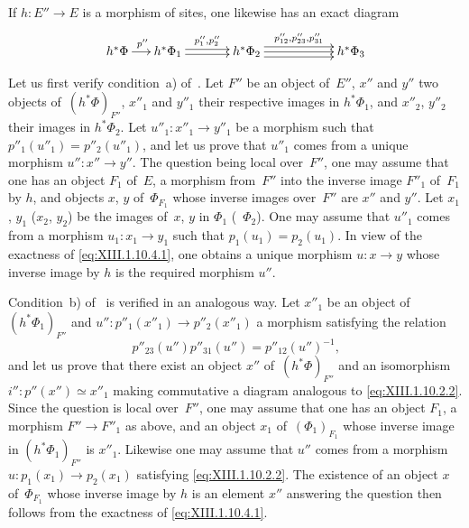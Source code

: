If $h \colon E'' \to E$ is a morphism of sites, one likewise has an
exact diagram
$$
\xymatrix@C=.5cm{ h^* \Phi \ar[r]^{p''} & h^* \Phi_1
\ar@<2pt>[rr]^{p''_1,p''_2} \ar@<-2pt>[rr] && h^* \Phi_2
\ar@<4pt>[rrr]^{p''_{12},p''_{23},p''_{31}} \ar[rrr] \ar@<-4pt>[rrr] &&&
h^* \Phi_3 }
$$

Let us first verify condition~a) of~. Let
$F''$ be an object of~$E''$, $x''$ and $y''$ two objects of~$(h^*
\Phi)_{F''}$, $x''_1$ and $y''_1$ their respective images in
$h^* \Phi_1$, and $x''_2$, $y''_2$ their images in $h^*
\Phi_2$. Let $u''_1 \colon x''_1 \to y''_1$ be a morphism such that
$p''_1(u''_1) = p''_2(u''_1)$, and let us prove that $u''_1$ comes
from a unique morphism $u'' \colon x'' \to y''$. The question being
local over~$F''$, one may assume that one has an object $F_1$ of~$E$, a
morphism from~$F''$ into the inverse image $F''_1$ of~$F_1$ by $h$, and
objects $x$, $y$ of~$\Phi_{F_1}$ whose inverse images over~$F''$
are $x''$ and $y''$. Let $x_1$, $y_1$ (\resp $x_2$, $y_2$) be the
images of~$x$, $y$ in $\Phi_1$ (\resp~$\Phi_2$). One may assume
that $u''_1$ comes from a morphism $u_1 \colon x_1 \to y_1$ such that
$p_1(u_1) = p_2(u_1)$. In view of the exactness of
\eqref{eq:XIII.1.10.4.1}, one obtains a unique morphism $u \colon x
\to y$ whose inverse image by $h$ is the required morphism
$u''$.

Condition~b)
of~ is verified in an analogous
way. Let $x''_1$ be an object of~$(h^* \Phi_1)_{F''}$ and $u''
\colon p''_1(x''_1) \to p''_2(x''_1)$ a morphism satisfying
the relation
$$
p''_{23}(u'')p''_{31}(u'')=p''_{12}(u'')^{-1} \text{,}
$$
and let us prove that there exist an object $x''$ of~$(h^* \Phi)_{F''}$ and
an isomorphism $i'' \colon p''(x'') \simeq x''_1$ making commutative
a diagram analogous to \eqref{eq:XIII.1.10.2.2}. Since the
question is local over~$F''$, one may assume that one has an object
$F_1$, a morphism $F'' \to F''_1$ as above, and an object $x_1$
of~$(\Phi_1)_{F_1}$ whose inverse image in $(h^* \Phi_1)_{F''}$
is $x''_1$. Likewise one may assume that $u''$ comes from a
morphism $u \colon p_1(x_1) \to p_2(x_1)$ satisfying
\eqref{eq:XIII.1.10.2.2}. The existence of an object $x$ of~$\Phi_{F_1}$
whose inverse image by $h$ is an element $x''$
answering the question then follows from the exactness of
\eqref{eq:XIII.1.10.4.1}.

